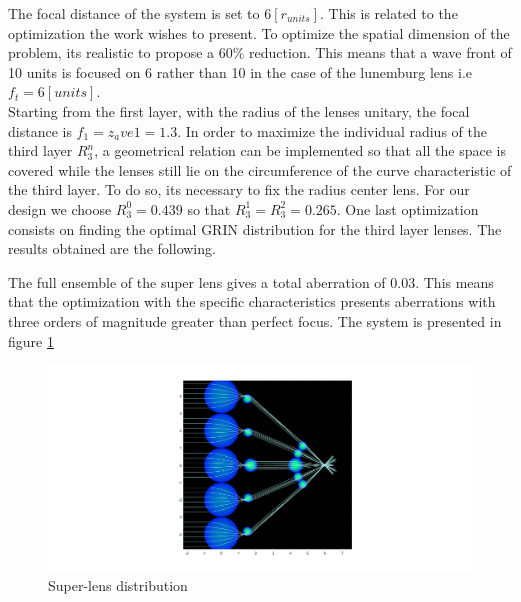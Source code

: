 The focal distance of the system is set to $6 [r_{units}]$. This is related to the optimization the work wishes to present. To optimize the spatial dimension of the problem, its realistic to propose a $60\%$ reduction. This means that a wave front of 10 units is focused on 6 rather than 10 in the case of the lunemburg lens i.e $f_t = 6 [units]$. \\

Starting from the first layer, with the radius of the lenses unitary, the focal distance is $f_1 = z_ave1=1.3$.  In order to maximize the individual radius of the third layer $R_3^n$, a geometrical relation can be implemented so that all the space is covered while the lenses still lie on the circumference of the curve characteristic of the third layer. To do so, its necessary to fix the radius center lens. For our design we choose $R_3^0 = 0.439$ so that $R_3^1 =R_3^2 = 0.265$. One last optimization consists on finding the optimal GRIN distribution for the third layer lenses. The results obtained are the following.

\begin{center}
    \begin{table}[H]
    \end{table}
\end{center}

The full ensemble of the super lens gives a total aberration of 0.03. This means that the optimization with the specific characteristics presents aberrations with three orders of magnitude greater than perfect focus. The system is presented in figure \ref{fig:superlens_v1}

\begin{figure}[H]
    \centering
    \includegraphics[scale=0.2]{Figures/MYSuperlens_final.png}
    \caption{Super-lens distribution}
    \label{fig:superlens_v1}
\end{figure}